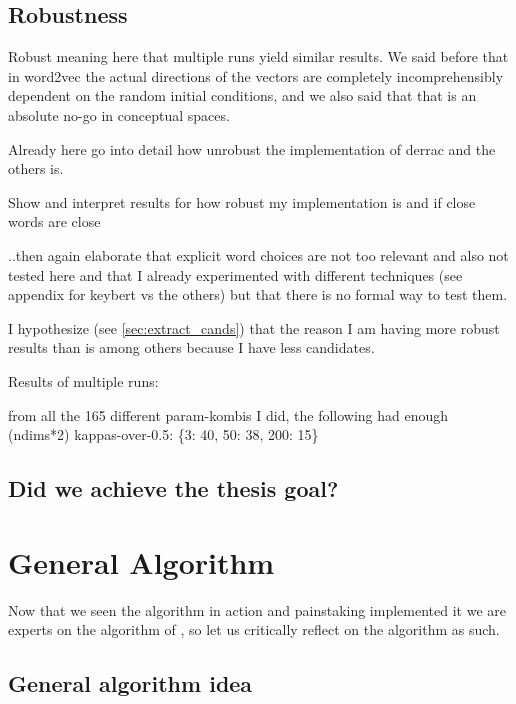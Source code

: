 \subsection{Robustness}

Robust meaning here that multiple runs yield similar results. We said before that in word2vec the actual directions of the vectors are completely incomprehensibly dependent on the random initial conditions, and we also said that that is an absolute no-go in conceptual spaces.

Already here go into detail how unrobust the implementation of derrac and the others is. 

Show and interpret results for how robust my implementation is and if close words are close

..then again elaborate that explicit word choices are not too relevant and also not tested here and that I already experimented with different techniques (see appendix for keybert vs the others) but that there is no formal way to test them.

I hypothesize (see \autoref{sec:extract_cands}) that the reason I am having more robust results than \cite{Derrac2015} is among others because I have less candidates.

Results of multiple runs: 

from all the 165 different param-kombis I did, the following had enough (ndims*2) kappas-over-0.5:
\{3: 40, 50: 38, 200: 15\}





\subsection{Did we achieve the thesis goal?}


\section{General Algorithm}

Now that we seen the algorithm in action and painstaking implemented it we are experts on the algorithm of \textcite{Derrac2015}, so let us critically reflect on the algorithm as such.

\subsection{General algorithm idea}


